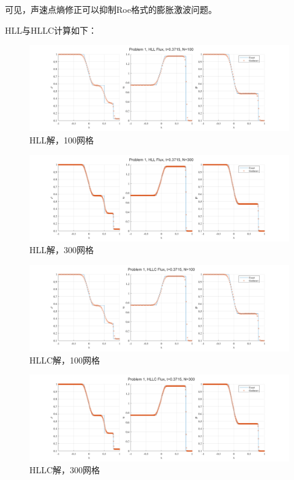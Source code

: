 \documentclass[UTF8,zihao=5]{ctexart} %
\begin{document}
可见，声速点熵修正可以抑制Roe格式的膨胀激波问题。

HLL与HLLC计算如下：

\begin{figure}[H]
    \centering
    \includegraphics[width=18cm]{p1_HLL_N100.png}  %
    \caption{HLL解，100网格}
\end{figure}

\begin{figure}[H]
    \centering
    \includegraphics[width=18cm]{p1_HLL_N300.png}  %
    \caption{HLL解，300网格}
\end{figure}

\begin{figure}[H]
    \centering
    \includegraphics[width=18cm]{p1_HLLC_N100.png}  %
    \caption{HLLC解，100网格}
\end{figure}

\begin{figure}[H]
    \centering
    \includegraphics[width=18cm]{p1_HLLC_N300.png}  %
    \caption{HLLC解，300网格}
\end{figure}
\end{document}
